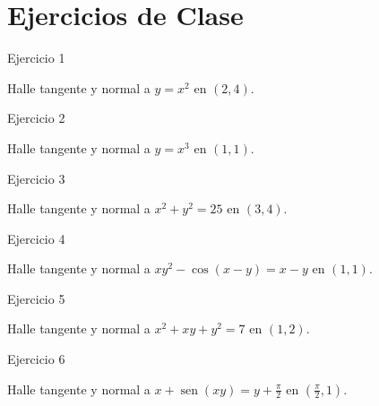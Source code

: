 \documentclass[aspectratio=169]{beamer}
\begin{document}
\section{Ejercicios de Clase}

\begin{frame}{Ejercicio 1}
  \begin{mwejercicio}
    Halle tangente y normal a $y = x^2$ en $(2, 4)$.
  \end{mwejercicio}
\end{frame}

\begin{frame}{Ejercicio 2}
  \begin{mwejercicio}
    Halle tangente y normal a $y = x^3$ en $(1, 1)$.
  \end{mwejercicio}
\end{frame}

\begin{frame}{Ejercicio 3}
  \begin{mwejercicio}
    Halle tangente y normal a $x^2 + y^2 = 25$ en $(3, 4)$.
  \end{mwejercicio}
\end{frame}

\begin{frame}{Ejercicio 4}
  \begin{mwejercicio}
    Halle tangente y normal a $xy^2 - \cos(x-y) = x - y$ en $(1, 1)$.
  \end{mwejercicio}
\end{frame}

\begin{frame}{Ejercicio 5}
  \begin{mwejercicio}
    Halle tangente y normal a $x^2 + xy + y^2 = 7$ en $(1, 2)$.
  \end{mwejercicio}
\end{frame}

\begin{frame}{Ejercicio 6}
  \begin{mwejercicio}
    Halle tangente y normal a $x + \operatorname{sen}(xy) = y + \frac{\pi}{2}$ en $\left(\frac{\pi}{2}, 1\right)$.
  \end{mwejercicio}
\end{frame}
\end{document}
